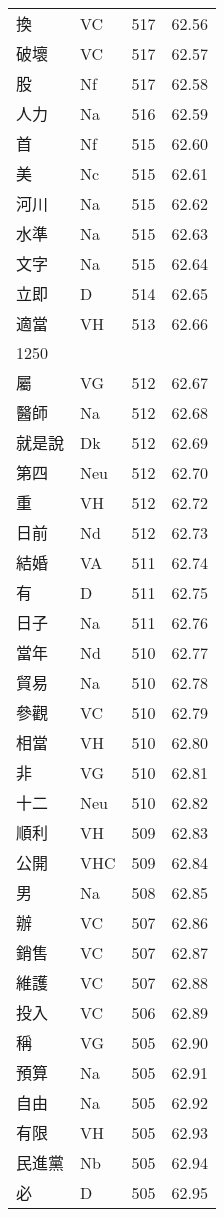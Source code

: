 \documentclass[twocolumn]{book}
\begin{document}
\begin{supertabular}{llrr}
換 & VC & 517 &  62.56\\
破壞 & VC & 517 &  62.57\\
股 & Nf & 517 &  62.58\\
人力 & Na & 516 &  62.59\\
首 & Nf & 515 &  62.60\\
美 & Nc & 515 &  62.61\\
河川 & Na & 515 &  62.62\\
水準 & Na & 515 &  62.63\\
文字 & Na & 515 &  62.64\\
立即 & D & 514 &  62.65\\
適當 & VH & 513 &  62.66\\
1250\\
屬 & VG & 512 &  62.67\\
醫師 & Na & 512 &  62.68\\
就是說 & Dk & 512 &  62.69\\
第四 & Neu & 512 &  62.70\\
重 & VH & 512 &  62.72\\
日前 & Nd & 512 &  62.73\\
結婚 & VA & 511 &  62.74\\
有 & D & 511 &  62.75\\
日子 & Na & 511 &  62.76\\
當年 & Nd & 510 &  62.77\\
貿易 & Na & 510 &  62.78\\
參觀 & VC & 510 &  62.79\\
相當 & VH & 510 &  62.80\\
非 & VG & 510 &  62.81\\
十二 & Neu & 510 &  62.82\\
順利 & VH & 509 &  62.83\\
公開 & VHC & 509 &  62.84\\
男 & Na & 508 &  62.85\\
辦 & VC & 507 &  62.86\\
銷售 & VC & 507 &  62.87\\
維護 & VC & 507 &  62.88\\
投入 & VC & 506 &  62.89\\
稱 & VG & 505 &  62.90\\
預算 & Na & 505 &  62.91\\
自由 & Na & 505 &  62.92\\
有限 & VH & 505 &  62.93\\
民進黨 & Nb & 505 &  62.94\\
必 & D & 505 &  62.95\\

\end{supertabular}
\end{document}
